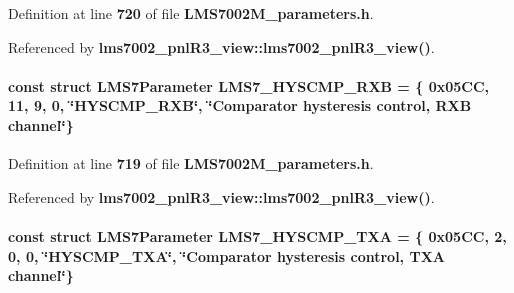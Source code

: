 Definition at line {\bf 720} of file {\bf L\+M\+S7002\+M\+\_\+parameters.\+h}.



Referenced by {\bf lms7002\+\_\+pnl\+R3\+\_\+view\+::lms7002\+\_\+pnl\+R3\+\_\+view()}.

\paragraph[{L\+M\+S7\+\_\+\+H\+Y\+S\+C\+M\+P\+\_\+\+R\+XB}]{\setlength{\rightskip}{0pt plus 5cm}const struct {\bf L\+M\+S7\+Parameter} L\+M\+S7\+\_\+\+H\+Y\+S\+C\+M\+P\+\_\+\+R\+XB = \{ 0x05\+C\+C, 11, 9, 0, \char`\"{}\+H\+Y\+S\+C\+M\+P\+\_\+\+R\+X\+B\char`\"{}, \char`\"{}\+Comparator hysteresis control, R\+X\+B channel\char`\"{}\}\hspace{0.3cm}{\ttfamily [static]}}\label{LMS7002M__parameters_8h_ae14bdf841009ea95c5fe8345571f5bff}


Definition at line {\bf 719} of file {\bf L\+M\+S7002\+M\+\_\+parameters.\+h}.



Referenced by {\bf lms7002\+\_\+pnl\+R3\+\_\+view\+::lms7002\+\_\+pnl\+R3\+\_\+view()}.

\paragraph[{L\+M\+S7\+\_\+\+H\+Y\+S\+C\+M\+P\+\_\+\+T\+XA}]{\setlength{\rightskip}{0pt plus 5cm}const struct {\bf L\+M\+S7\+Parameter} L\+M\+S7\+\_\+\+H\+Y\+S\+C\+M\+P\+\_\+\+T\+XA = \{ 0x05\+C\+C, 2, 0, 0, \char`\"{}\+H\+Y\+S\+C\+M\+P\+\_\+\+T\+X\+A\char`\"{}, \char`\"{}\+Comparator hysteresis control, T\+X\+A channel\char`\"{}\}\hspace{0.3cm}{\ttfamily [static]}}\label{LMS7002M__parameters_8h_a2fbef98232289df3e74a4ae5ca1c475e}


